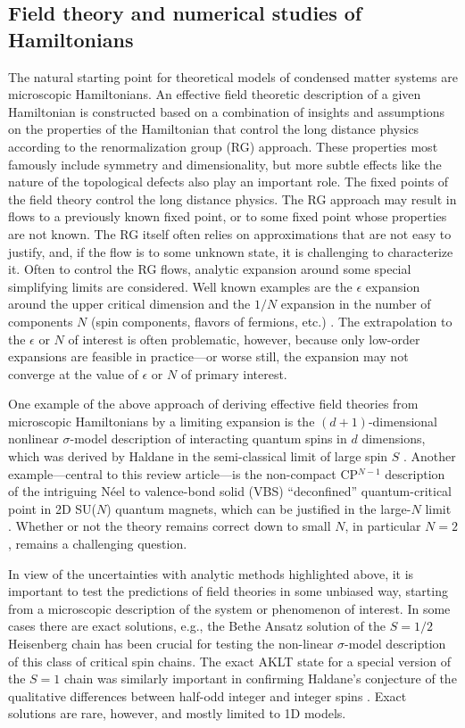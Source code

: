 \documentclass[range]{ar2e}
\begin{document}
\subsection{Field theory and numerical studies of Hamiltonians}

The natural starting point for theoretical models of condensed matter systems are microscopic Hamiltonians.
An effective field theoretic description  of a given Hamiltonian 
is constructed based on a combination of insights and assumptions on the properties of the Hamiltonian that control the long distance physics according to the renormalization group (RG) approach. These properties most famously include symmetry and dimensionality, but more subtle effects like the nature of the topological defects also play an important role.  The fixed points of the field theory control the long distance physics.
The RG approach may result in flows to a previously known fixed point, or to some fixed point
whose properties are not known. The RG itself often relies on approximations that are not easy
to justify, and, if the flow is to some unknown state, it is challenging to characterize it. 
Often to control the RG flows, analytic expansion around some special simplifying limits are considered. Well known examples are the $\epsilon$ expansion
around the upper critical dimension and the $1/N$ expansion in the number of components $N$ (spin components, flavors of fermions, etc.)
\cite{herbut2007:book,barber1972:lgNeps}. The
extrapolation to the $\epsilon$ or $N$ of interest is often problematic, however, because only low-order
expansions are feasible in practice---or worse still, the expansion may not converge at the value of $\epsilon$ or $N$ of primary interest.

One example of the above approach of deriving effective field theories from microscopic Hamiltonians by a limiting expansion is the $(d+1)$-dimensional
nonlinear $\sigma$-model description of interacting quantum spins in $d$ dimensions, which was derived by Haldane in 
the semi-classical limit of large spin $S$ \cite{Haldane83,Chakravarty89,Auerbach94}.  Another example---central to this review article---is the 
non-compact CP$^{N-1}$ description of the intriguing  N\'eel to valence-bond solid (VBS) ``deconfined'' quantum-critical point in 2D 
SU($N$) quantum magnets, which can be justified in the large-$N$ limit \cite{Senthil04a,Sachdev08}. Whether or not the theory remains correct down to 
small $N$, in particular $N=2$, remains a challenging question.

In view of the uncertainties with analytic methods highlighted above, it is important to test the predictions of field theories in some unbiased way,
starting from a microscopic description of the system or phenomenon of interest. In some cases there are exact solutions, 
e.g., the Bethe Ansatz solution of the $S=1/2$ Heisenberg chain \cite{Bethe31} has been crucial for testing 
the non-linear $\sigma$-model description of this class of critical spin chains. The exact AKLT state \cite{affleck88} for a special 
version of the $S=1$ chain was similarly important in confirming Haldane's conjecture of the qualitative differences between 
half-odd integer and integer spins \cite{Haldane83}. Exact solutions are rare, however, and mostly limited to 1D models.
 
\end{document}
